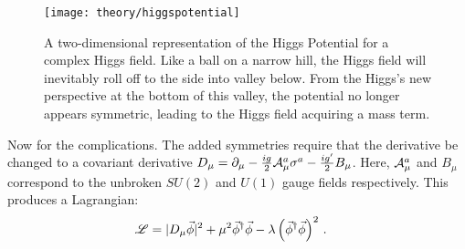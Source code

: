    \begin{figure}[h!]
        \texttt{[image: theory/higgspotential]}
        \caption{A two-dimensional representation of the Higgs Potential for a complex Higgs field\cite{higgspotential}.
            Like a ball on a narrow hill, the Higgs field will inevitably roll off to the side into valley below.
            From the Higgs's new perspective at the bottom of this valley,
                the potential no longer appears symmetric,
                leading to the Higgs field acquiring a mass term.
        }
        \label{fig:higgs_potential}
    \end{figure}

    Now for the complications.
    The added symmetries require that the derivative be changed to a covariant derivative 
        $D_{\mu} = \partial_{\mu} - \frac{ig}{2} \mathcal{A}^a_{\mu} \sigma^a - \frac{ig'}{2} B_{\mu}$.
    Here, $\mathcal{A}^a_\mu$ and $B_\mu$ correspond to the unbroken $SU(2)$ and $U(1)$ gauge fields respectively.
    This produces a Lagrangian:
    \begin{equation} \begin{split}
        \mathscr{L} &= |D_{\mu} \vec{\phi}|^2 +
            \mu^2 \vec{\phi}^\dag \vec{\phi} - \lambda \left( \vec{\phi}^\dag\vec{\phi} \right)^2
        \,.
    \end{split} \end{equation}


